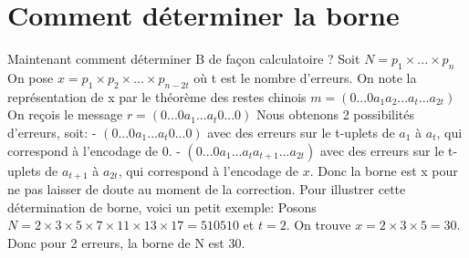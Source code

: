 \documentclass[a4paper, 11pt]{report}
\begin{document}
\newpage

\section{Comment déterminer la borne}


Maintenant comment déterminer B de façon calculatoire ? \newline
Soit $N=p_1\times ...\times p_n$
On pose $x=p_1 \times p_2 \times ... \times p_{n-2t}$ où t est le nombre d'erreurs. \newline
On note la représentation de x par le théorème des restes chinois $m=(0...0 a_1 a_2 ... a_t ... a_{2t})$ \newline
On reçois le message $r=(0...0 a_1...a_t 0...0)$ \newline
Nous obtenons 2 possibilités d'erreurs, soit: \newline
- $(0...0 a_1...a_t 0...0) $ avec des erreurs sur le t-uplets de $a_1$ à $a_t$, qui correspond à l'encodage de 0. \newline
- $(0...0 a_1...a_t a_{t+1}...a_{2t})$ avec des erreurs sur le t-uplets de $a_{t+1}$ à $a_{2t}$, qui correspond à l'encodage de $x$. \newline
Donc la borne est x pour ne pas laisser de doute au moment de la correction. \newline
\newline
Pour illustrer cette détermination de borne, voici un petit exemple: \newline
Posons $N=2\times 3\times 5\times 7\times 11\times 13 \times 17= 510510$ et $t=2$. \newline
On trouve $x=2\times 3\times 5=30$. Donc pour 2 erreurs, la borne de N est 30.
\end{document}
